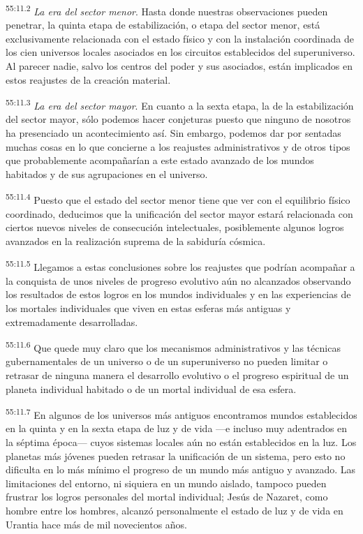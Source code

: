 \par
\textsuperscript{55:11.2} \textit{La era del sector menor}. Hasta donde nuestras observaciones pueden penetrar, la quinta etapa de estabilización, o etapa del sector menor, está exclusivamente relacionada con el estado físico y con la instalación coordinada de los cien universos locales asociados en los circuitos establecidos del superuniverso. Al parecer nadie, salvo los centros del poder y sus asociados, están implicados en estos reajustes de la creación material.

\par
\textsuperscript{55:11.3} \textit{La era del sector mayor}. En cuanto a la sexta etapa, la de la estabilización del sector mayor, sólo podemos hacer conjeturas puesto que ninguno de nosotros ha presenciado un acontecimiento así. Sin embargo, podemos dar por sentadas muchas cosas en lo que concierne a los reajustes administrativos y de otros tipos que probablemente acompañarían a este estado avanzado de los mundos habitados y de sus agrupaciones en el universo.

\par
\textsuperscript{55:11.4} Puesto que el estado del sector menor tiene que ver con el equilibrio físico coordinado, deducimos que la unificación del sector mayor estará relacionada con ciertos nuevos niveles de consecución intelectuales, posiblemente algunos logros avanzados en la realización suprema de la sabiduría cósmica.

\par
\textsuperscript{55:11.5} Llegamos a estas conclusiones sobre los reajustes que podrían acompañar a la conquista de unos niveles de progreso evolutivo aún no alcanzados observando los resultados de estos logros en los mundos individuales y en las experiencias de los mortales individuales que viven en estas esferas más antiguas y extremadamente desarrolladas.

\par
\textsuperscript{55:11.6} Que quede muy claro que los mecanismos administrativos y las técnicas gubernamentales de un universo o de un superuniverso no pueden limitar o retrasar de ninguna manera el desarrollo evolutivo o el progreso espiritual de un planeta individual habitado o de un mortal individual de esa esfera.

\par
\textsuperscript{55:11.7} En algunos de los universos más antiguos encontramos mundos establecidos en la quinta y en la sexta etapa de luz y de vida ---e incluso muy adentrados en la séptima época--- cuyos sistemas locales aún no están establecidos en la luz. Los planetas más jóvenes pueden retrasar la unificación de un sistema, pero esto no dificulta en lo más mínimo el progreso de un mundo más antiguo y avanzado. Las limitaciones del entorno, ni siquiera en un mundo aislado, tampoco pueden frustrar los logros personales del mortal individual; Jesús de Nazaret, como hombre entre los hombres, alcanzó personalmente el estado de luz y de vida en Urantia hace más de mil novecientos años.

